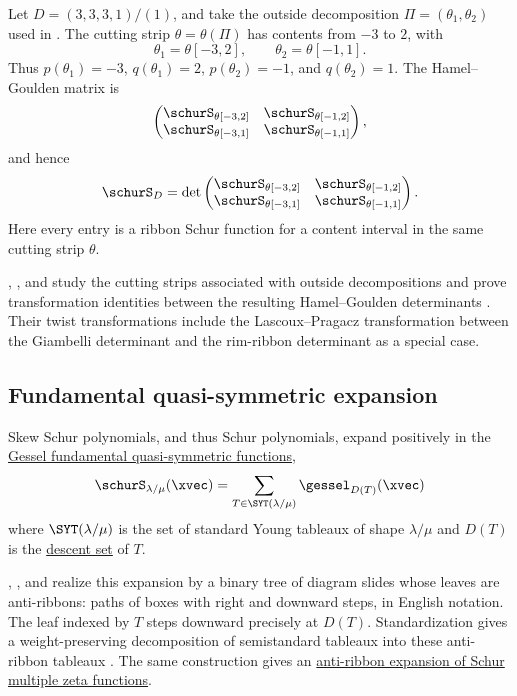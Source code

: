 \begin{example}
Let $D=(3,3,3,1)/(1)$, and take the outside decomposition
$\Pi=(\theta_1,\theta_2)$ used in
\cite[Ex.~2.2]{McNamaraWilligenburg2009}.  The cutting strip
$\theta=\theta(\Pi)$ has contents from $-3$ to $2$, with
\[
  \theta_1=\theta[-3,2],
  \qquad
  \theta_2=\theta[-1,1].
\]
Thus $p(\theta_1)=-3$, $q(\theta_1)=2$, $p(\theta_2)=-1$, and
$q(\theta_2)=1$.  The Hamel--Goulden matrix is
\[
  \begin{pmatrix}
    \schurS_{\theta[-3,2]} & \schurS_{\theta[-1,2]} \\
    \schurS_{\theta[-3,1]} & \schurS_{\theta[-1,1]}
  \end{pmatrix},
\]
and hence
\[
  \schurS_D
  =
  \det
  \begin{pmatrix}
    \schurS_{\theta[-3,2]} & \schurS_{\theta[-1,2]} \\
    \schurS_{\theta[-3,1]} & \schurS_{\theta[-1,1]}
  \end{pmatrix}.
\]
Here every entry is a ribbon Schur function for a content interval in the same
cutting strip $\theta$.
\end{example}

, , and
 study the cutting strips associated with outside
decompositions and prove transformation identities between the resulting
Hamel--Goulden determinants \cite{ChenYanYang2005}.  Their twist
transformations include the Lascoux--Pragacz transformation between the
Giambelli determinant and the rim-ribbon determinant as a special case.


\subsection[skewSchurGesselExpansion]{Fundamental quasi-symmetric expansion}


Skew Schur polynomials, and thus Schur polynomials, expand positively in the
\hyperref[gessel]{Gessel fundamental quasi-symmetric functions},
\[
\schurS_{\lambda/\mu}(\xvec) = \sum_{T \in \SYT(\lambda/\mu)} \gessel_{D(T)}(\xvec)
\]
where $\SYT(\lambda/\mu)$ is the set of standard Young tableaux of shape
$\lambda/\mu$ and $D(T)$ is the \hyperref[tableauDescentSet]{descent set} of $T$.

, , and 
realize this expansion by a binary tree of diagram slides whose leaves are
anti-ribbons: paths of boxes with right and downward steps, in English
notation. The leaf indexed by $T$ steps downward precisely at $D(T)$.
Standardization gives a weight-preserving decomposition of semistandard
tableaux into these anti-ribbon tableaux
\cite[Thms.~3.22, 4.3 and 5.2]{MuraharaNakasujiTakeda2026x}.
The same construction gives an
\hyperref[schurZetaAntiRibbon]{anti-ribbon expansion of Schur multiple zeta functions}.


